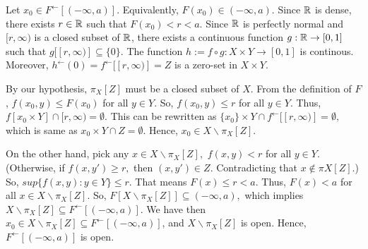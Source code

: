 \documentclass{article}
\begin{document}
Let $x_0 \in F^\leftarrow [(-\infty,a)]$. Equivalently, $F(x_0)\in (-\infty,a).$ Since $\Bbb{R}$ is dense, there exists $r \in \Bbb{R}$ such that $F(x_0) <r <a.$ 
Since $\Bbb{R}$ is perfectly normal and $[r, \infty)$ is a closed subset of $\Bbb{R}$, there exists a continuous function $g: \Bbb{R} \rightarrow [0,1]$ such that $g[[r, \infty)]\subseteq \{0\}.$ The function $h:=f\circ g: X\times Y \rightarrow [0,1]$ is continous. Moreover, $h^\leftarrow(0)=f^\leftarrow[[r,\infty)]=Z$ is a zero-set in $X\times Y$.

By our hypothesis, $\pi_X[Z]$ must be a closed subset of $X$. 
From the definition of $F$, $f(x_0,y)\leq F(x_0) $ for all $y\in Y$. So, $f(x_0,y)\leq r$ for all $y \in Y$. Thus, $f[{x_0}\times Y]\cap [r,\infty)=\emptyset.$ This can be rewritten as $\{x_0\} \times Y \cap f^\leftarrow[[r,\infty)] =\emptyset,$ which is same as $x_0\times Y \cap Z =\emptyset.$ Hence, $x_0\in X \backslash \pi_X[Z].$ 

	On the other hand, pick any $x\in X \backslash \pi_X[Z],$ $f(x,y)<r$ for all $y\in Y.$(Otherwise, if $f(x,y')\geq r,$ then $(x,y')\in Z.$ Contradicting that $x\notin \pi X[Z]$.) So, $sup\{f(x,y):y\in Y\}\leq r.$ That means $F(x)\leq r <a.$ Thus, $F(x)<a$ for all $x \in 
X \backslash \pi_X[Z].$  So, $F[X\backslash \pi_X[Z]] \subseteq (-\infty, a),$ which implies $X\backslash \pi_X[Z] \subseteq F^\leftarrow [(-\infty, a)].$ We have then $x_0\in X\backslash \pi_X[Z] \subseteq F^\leftarrow [(-\infty, a)]$, and $X\backslash \pi_X[Z]$ is open. Hence,  $F^\leftarrow[(-\infty, a)]$ is open.\\
\end{document}
